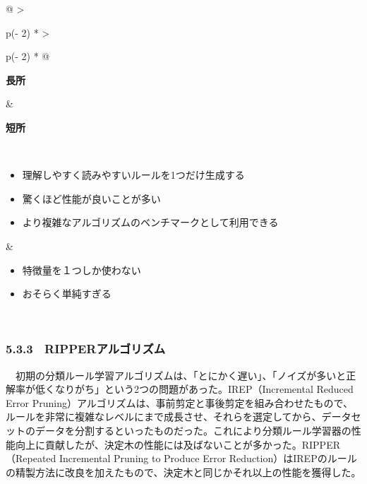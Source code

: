 \documentclass[
]{article}
\providecommand{\tightlist}{%
  \setlength{\itemsep}{0pt}\setlength{\parskip}{0pt}}
\begin{document}
\begin{longtable}[]{@{}
  >{\raggedright\arraybackslash}p{(\columnwidth - 2\tabcolsep) * }
  >{\raggedright\arraybackslash}p{(\columnwidth - 2\tabcolsep) * }@{}}
\toprule\noalign{}
\begin{minipage}[b]{\linewidth}\raggedright
\textbf{長所}
\end{minipage} & \begin{minipage}[b]{\linewidth}\raggedright
\textbf{短所}
\end{minipage} \\
\midrule\noalign{}
\endhead
\bottomrule\noalign{}
\endlastfoot
\begin{minipage}[t]{\linewidth}\raggedright
\begin{itemize}
\tightlist
\item
  理解しやすく読みやすいルールを1つだけ生成する
\item
  驚くほど性能が良いことが多い
\item
  より複雑なアルゴリズムのベンチマークとして利用できる
\end{itemize}
\end{minipage} & \begin{minipage}[t]{\linewidth}\raggedright
\begin{itemize}
\tightlist
\item
  特徴量を１つしか使わない
\item
  おそらく単純すぎる \textbar{}
\end{itemize}
\end{minipage} \\
\end{longtable}

\subsubsection{5.3.3　RIPPERアルゴリズム}\label{ripperux30a2ux30ebux30b4ux30eaux30baux30e0}

　初期の分類ルール学習アルゴリズムは、「とにかく遅い」、「ノイズが多いと正解率が低くなりがち」という2つの問題があった。IREP（Incremental
Reduced Error
Pruning）アルゴリズムは、事前剪定と事後剪定を組み合わせたもので、ルールを非常に複雑なレベルにまで成長させ、それらを選定してから、データセットのデータを分割するといったものだった。これにより分類ルール学習器の性能向上に貢献したが、決定木の性能には及ばないことが多かった。RIPPER（Repeated
Incremental Pruning to Produce Error
Reduction）はIREPのルールの精製方法に改良を加えたもので、決定木と同じかそれ以上の性能を獲得した。
\end{document}
